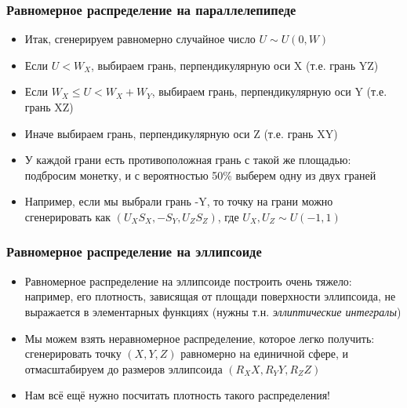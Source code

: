 \documentclass[handout,10pt]{beamer}
\begin{document}
\begin{frame}
\frametitle{Равномерное распределение на параллелепипеде}
\begin{itemize}
\item Итак, сгенерируем равномерно случайное число \begin{math}U \sim U(0, W)\end{math}
\pause
\item Если \begin{math}U < W_X\end{math}, выбираем грань, перпендикулярную оси X (т.е. грань YZ)
\pause
\item Если \begin{math}W_X \leq U < W_X + W_Y\end{math}, выбираем грань, перпендикулярную оси Y (т.е. грань XZ)
\pause
\item Иначе выбираем грань, перпендикулярную оси Z (т.е. грань XY)
\pause
\item У каждой грани есть противоположная грань с такой же площадью: подбросим монетку, и с вероятностью 50\% выберем одну из двух граней
\pause
\item Например, если мы выбрали грань -Y, то точку на грани можно сгенерировать как \begin{math}(U_X S_X, -S_Y, U_Z S_Z)\end{math}, где \begin{math}U_X, U_Z \sim U(-1, 1)\end{math}
\end{itemize}
\end{frame}

\begin{frame}
\frametitle{Равномерное распределение на эллипсоиде}
\begin{itemize}
\item Равномерное распределение на эллипсоиде построить очень тяжело: например, его плотность, зависящая от площади поверхности эллипсоида, не выражается в элементарных функциях (нужны т.н. \textit{эллиптические интегралы})
\pause
\item Мы можем взять неравномерное распределение, которое легко получить: сгенерировать точку \begin{math}(X,Y,Z)\end{math} равномерно на единичной сфере, и отмасштабируем до размеров эллипсоида \begin{math}(R_XX,R_YY,R_ZZ)\end{math}
\pause
\item Нам всё ещё нужно посчитать плотность такого распределения!
\end{itemize}
\end{frame}
\end{document}
